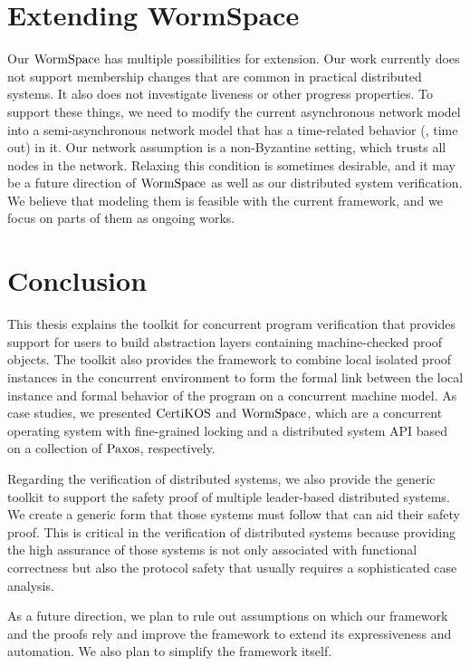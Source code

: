 \section{Extending WormSpace}

Our $\mathrm{WormSpace}$ has multiple possibilities for extension. Our work currently does not support membership changes 
that are common in practical distributed systems. It also does not investigate liveness or other progress properties. 
To support these things, we need to modify the current asynchronous network model into a semi-asynchronous 
network model that has a time-related behavior (\ie, time out) in it. 
Our network assumption is a non-Byzantine setting, which trusts all nodes in the network. Relaxing this condition is sometimes desirable,
 and it may be a future direction of  $\mathrm{WormSpace}$ as well as our distributed system verification. 
 We believe that modeling them is feasible with the current framework, and we focus on parts of them as ongoing works.
 
 
\section{Conclusion}

This thesis explains the toolkit for concurrent program verification that provides support for users to build abstraction layers containing 
machine-checked proof objects. The toolkit also provides the framework to combine local isolated proof instances in the concurrent environment 
to form the  formal link between the local instance and formal behavior of the program on a concurrent machine model. 
As case studies, we presented $\mathrm{CertiKOS}$ and $\mathrm{WormSpace}$, 
which are a concurrent operating system with fine-grained locking and a distributed system API based on a collection of $\mathrm{Paxos}$, respectively.

Regarding the verification of distributed systems, we also provide the generic toolkit to support the safety proof of multiple 
leader-based distributed systems. We create a generic form that those systems must follow that can aid their safety proof. 
This is critical in the verification of distributed systems because providing the high assurance of those systems is not only associated with 
functional correctness but also the protocol safety that usually requires a sophisticated case analysis.

As a future direction, we plan to rule out assumptions on which our framework and the proofs rely and improve the framework to
extend its expressiveness and automation. We also plan to simplify the framework itself.